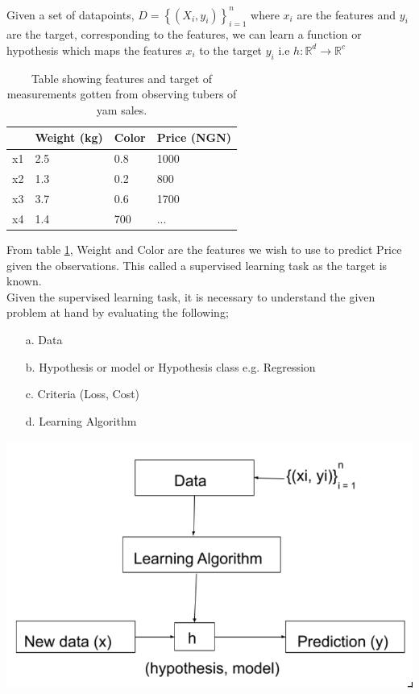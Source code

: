 \documentclass[12pt,a4paper,titlepage,portrait,openany]{book}
\begin{document}
	Given a set of datapoints, $ D = \left\{\left(X_i, y_i\right)\right\}_{i=1}^n $ where $x_i$ are the features and $y_i$ are the target, corresponding to the features, we can learn a function or hypothesis which maps the features $x_i$ to the target $y_i$ i.e $h : \mathbb{R}^d \to \mathbb{R}^c $
	\begin{table}[]\label{data_table}
		\begin{tabular}{|l|l|l|l|}
			\hline
			\textbf{} & \textbf{Weight (kg)} & \textbf{Color} & \textbf{Price (NGN)} \\ \hline
			x1                & 2.5                  & 0.8            & 1000                 \\ \hline
			x2                & 1.3                  & 0.2            & 800                  \\ \hline
			x3                & 3.7                  & 0.6            & 1700                 \\ \hline
			x4                & 1.4                  & 700            & ...                  \\ \hline
		\end{tabular}
	\caption {Table showing features and target of measurements gotten from observing tubers of yam sales. }
	\end{table}
	From table \ref{data_table}, Weight and Color are the features we wish to use to predict Price given the observations. This called a supervised learning task as the target is known.\\
	Given the supervised learning task, it is necessary to understand the given problem at hand by evaluating the following; \\
	\begin{enumerate}
		\item [a.] Data
		\item [b.] Hypothesis or model or Hypothesis class e.g. Regression
		\item [c.] Criteria (Loss, Cost)
		\item[d.] Learning Algorithm
	\end{enumerate}
\begin{center}
	\includegraphics[width=0.6\linewidth, height=0.18\textheight]{model}
\end{center}
	
\end{document}
